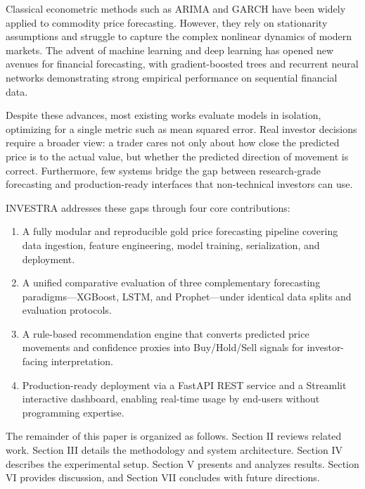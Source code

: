 \documentclass[journal,comsoc]{IEEEtran}
\begin{document}
Classical econometric methods such as ARIMA \cite{ashish2017attention} and GARCH \cite{hochreiter1997long} have been widely applied to commodity price forecasting. However, they rely on stationarity assumptions and struggle to capture the complex nonlinear dynamics of modern markets. The advent of machine learning and deep learning has opened new avenues for financial forecasting, with gradient-boosted trees \cite{taylor2018forecasting} and recurrent neural networks \cite{chen2016xgboost} demonstrating strong empirical performance on sequential financial data.

Despite these advances, most existing works evaluate models in isolation, optimizing for a single metric such as mean squared error. Real investor decisions require a broader view: a trader cares not only about how close the predicted price is to the actual value, but whether the predicted direction of movement is correct. Furthermore, few systems bridge the gap between research-grade forecasting and production-ready interfaces that non-technical investors can use.

INVESTRA addresses these gaps through four core contributions:
\begin{enumerate}
    \item A fully modular and reproducible gold price forecasting pipeline covering data ingestion, feature engineering, model training, serialization, and deployment.
    \item A unified comparative evaluation of three complementary forecasting paradigms—XGBoost, LSTM, and Prophet—under identical data splits and evaluation protocols.
    \item A rule-based recommendation engine that converts predicted price movements and confidence proxies into Buy/Hold/Sell signals for investor-facing interpretation.
    \item Production-ready deployment via a FastAPI REST service and a Streamlit interactive dashboard, enabling real-time usage by end-users without programming expertise.
\end{enumerate}

The remainder of this paper is organized as follows. Section II reviews related work. Section III details the methodology and system architecture. Section IV describes the experimental setup. Section V presents and analyzes results. Section VI provides discussion, and Section VII concludes with future directions.

\end{document}
